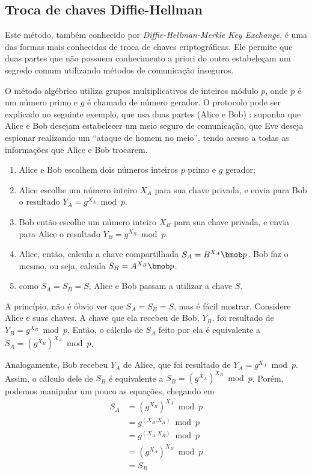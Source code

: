 
\subsection*{Troca de chaves Diffie-Hellman}

Este método, também conhecido por \emph{Diffie-Hellman-Merkle Key Exchange}, é uma das
formas mais conhecidas de troca de chaves criptográficas. Ele permite que duas partes
que não possuem conhecimento a priori do outro estabeleçam um segredo comum utilizando
métodos de comunicação inseguros.

O método algébrico utiliza grupos multiplicativos de inteiros módulo $p$, onde $p$ é um
número primo e $g$ é chamado de número gerador. O protocolo pode ser explicado no
seguinte exemplo, que usa duas partes (Alice e Bob)
\cite{book:schneier,artigo:diffiehellman}: suponha que Alice e Bob desejam estabelecer
um meio seguro de comunicação, que Eve deseja espionar realizando um ``ataque de homem
no meio'', tendo acesso a todas as informações que Alice e Bob trocarem.

\begin{enumerate}
    \item Alice e Bob escolhem dois números inteiros $p$ primo e $g$ gerador;

    \item Alice escolhe um número inteiro $X_{A}$ para sua chave privada, e envia para
        Bob o resultado $Y_{A} = g^{X_{A}} \bmod p$.

    \item Bob então escolhe um número inteiro $X_{B}$ para sua chave privada, e envia
        para Alice o resultado $Y_{B} = g^{X_{B}} \bmod p$.

    \item Alice, então, calcula a chave compartilhada $S_A = B^{X_{A}} \bmob p$. Bob faz
        o mesmo, ou seja, calcula $S_B = A^{X_{B}} \bmob p$.

    \item como $S_A = S_B = S$, Alice e Bob passam a utilizar a chave $S$.
\end{enumerate}

A princípio, não é óbvio ver que $S_A = S_B = S$, mas é fácil mostrar. Considere Alice e
suas chaves. A chave que ela recebeu de Bob, $Y_{B}$, foi resultado de
$Y_{B} = g^{X_{B}} \bmod p$. Então, o cálculo de $S_A$ feito por ela é equivalente a
$S_A = (g^{X_{B}})^{X_{A}} \bmod p$.

Analogamente, Bob recebeu $Y_{A}$ de Alice, que foi resultado de
$Y_{A} = g^{X_{A}} \bmod p$. Assim, o cálculo dele de $S_B$ é equivalente a
$S_B = (g^{X_{A}})^{X_{B}} \bmod p$. Porém, podemos manipular um pouco as equações,
chegando em
\begin{align*}
S_A & = (g^{X_{B}})^{X_{A}} \bmod p \\
    & = g^{(X_{B}.X_{A})}   \bmod p \\
    & = g^{(X_{A}.X_{B})}   \bmod p \\
    & = (g^{X_{A}})^{X_{B}} \bmod p \\
    & = S_B
\end{align*}

